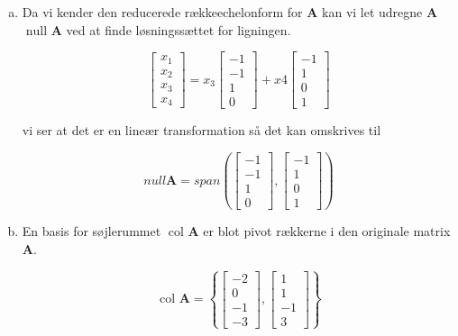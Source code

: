 \documentclass[12pt,a4paper]{article}
\begin{document}
\begin{enumerate}[(a)]

\item Da vi kender den reducerede rækkeechelonform for \textbf{A}  kan vi let udregne \textbf{A} $\operatorname{null}\mspace{1mu}\mathbf{A}$ ved at finde løsningssættet for ligningen.

\[
	\begin{bmatrix}
	x_1\\x_2\\x_3\\x_4
	\end{bmatrix} =
	x_3 
	\begin{bmatrix}
	-1 \\ -1 \\ 1 \\ 0
	\end{bmatrix}
	+ x4
	\begin{bmatrix}
	-1 \\ 1 \\ 0 \\ 1
	\end{bmatrix}	
\]

vi ser at det er en lineær transformation så det kan omskrives til 

\[null \textbf{A} = span
	\left( \begin{bmatrix}
	-1 \\ -1 \\ 1 \\ 0
	\end{bmatrix},
	\begin{bmatrix}
	-1 \\ 1 \\ 0 \\ 1
	\end{bmatrix} \right )	
\] 

\item En basis for søjlerummet $\operatorname{col}\mspace{1mu}\mathbf{A}$ er blot pivot rækkerne i den originale matrix \textbf{A}.

\[ \operatorname{col}\mspace{1mu}\mathbf{A} =
\left\{ 
\begin{bmatrix}
	-2 \\ 0 \\ -1 \\ -3
\end{bmatrix} ,
\begin{bmatrix}
	1 \\ 1 \\ -1 \\ 3
\end{bmatrix}
\right\}
\] 


\end{enumerate}
\end{document}
